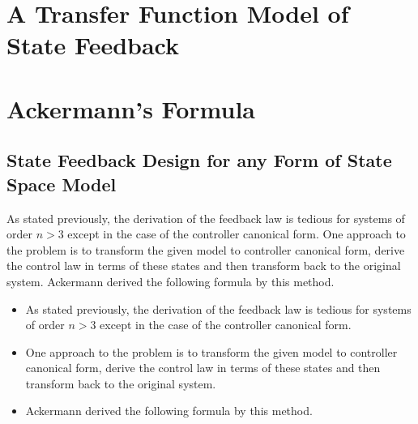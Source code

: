 


\section*{A Transfer Function Model of State Feedback} %
\label{sec:a_transfer_function_model_of_state_feedback}


\ifslidesonly
\begin{slide}
   
\end{slide}
\fi


\ifslidesonly
\begin{slide}
   
\end{slide}
\fi




\section*{Ackermann's Formula} %
\label{sec:ackermann_s_formula}

\subsection*{State Feedback Design for any Form of State Space Model} %
As stated previously, the derivation of the feedback law is tedious for systems of order  $n>3$  except in the case of the controller canonical form. One approach to the problem is to transform the given model to controller canonical form, derive the control law in terms of these states and then transform back to the original system. Ackermann derived the following formula by this method.
\ifslidesonly
\begin{slide}
\begin{itemize}
	\item As stated previously, the derivation of the feedback law is tedious for systems of order  $n>3$  except in the case of the controller canonical form.
	\item One approach to the problem is to transform the given model to controller canonical form, derive the control law in terms of these states and then transform back to the original system.
	\item Ackermann derived the following formula by this method.
\end{itemize}
\end{slide}
\fi

